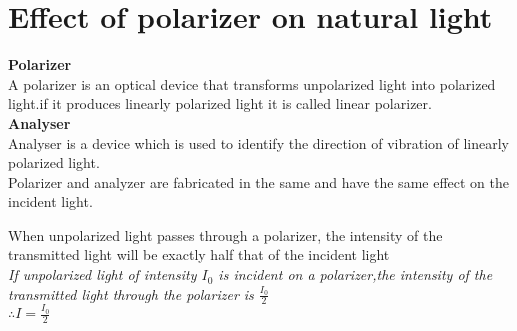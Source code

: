   \section{Effect of polarizer on natural light}
  \textbf{Polarizer}\\
  A polarizer is an optical device that transforms unpolarized light into polarized light.if it produces linearly polarized light it is called linear polarizer.\\
  \textbf{Analyser} \\
  Analyser is a device which is used to identify the direction of vibration of linearly polarized light.\\
  Polarizer and analyzer are fabricated in the same and have the same effect on the incident light.
         \par When unpolarized light passes through a polarizer, the intensity of the transmitted light will be exactly half that of the incident light \\
         \textit{If unpolarized light of intensity $I_0$ is incident on a polarizer,the intensity of the transmitted light through the polarizer is $\frac{I_0}{2}$}\\
         $\therefore I=\frac{I_0}{2}$
